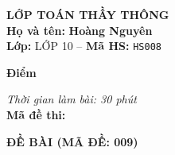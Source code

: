 \noindent
\begin{tcolorbox}[colback=white,colframe=black,arc=0mm,boxrule=0.8pt,top=4pt,bottom=4pt,left=6pt,right=6pt]
	\begin{minipage}[c]{0.44\textwidth}
		{\bfseries\large LỚP TOÁN THẦY THÔNG}\\[3pt]
		\textbf{Họ và tên:} \textbf{\large Hoàng Nguyên}\\[3pt]
		\textbf{Lớp:} LỚP 10 \quad -- \quad \textbf{Mã HS:} \texttt{HS008}
	\end{minipage}
	\hfill
	\begin{minipage}[c]{0.22\textwidth}
		\begin{tcolorbox}[colback=white,colframe=black,arc=0mm,boxrule=0.6pt,height=1.8cm,halign=center,valign=top,top=2pt]
			{\bfseries\normalsize Điểm}
		\end{tcolorbox}
	\end{minipage}
	\hfill
	\begin{minipage}[c]{0.30\textwidth}
		\raggedleft
		\textit{Thời gian làm bài: 30 phút}\\[4pt]
		\textbf{Mã đề thi:} 
	\end{minipage}
\end{tcolorbox}
\vspace{0.25cm}

\noindent\textbf{\large ĐỀ BÀI (MÃ ĐỀ: 009)}
\vspace{0.1cm}

